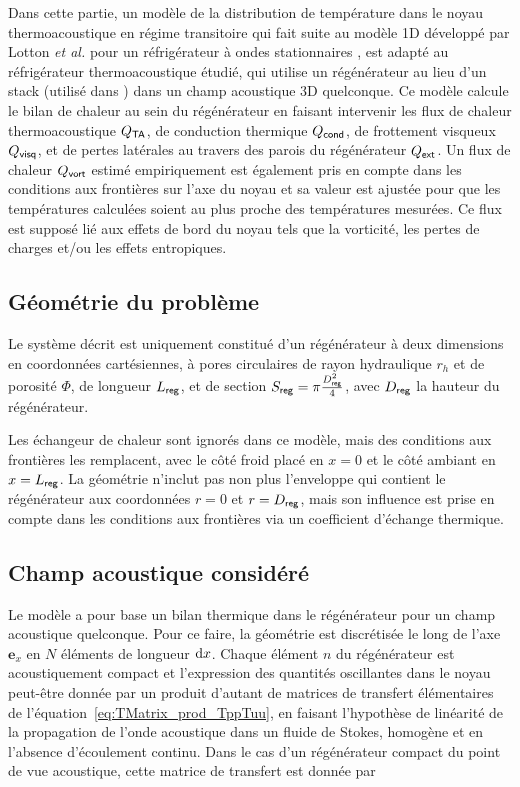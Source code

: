 Dans cette partie, un modèle de la distribution de température dans le noyau thermoacoustique en régime transitoire qui fait suite au modèle 1D développé par Lotton \textit{et al.} pour un réfrigérateur à ondes stationnaires \cite{lotton_transient_2009}, est adapté au réfrigérateur thermoacoustique étudié, qui utilise un régénérateur au lieu d'un stack (utilisé dans \cite{lotton_transient_2009}) dans un champ acoustique 3D quelconque. Ce modèle calcule le bilan de chaleur au sein du régénérateur en faisant intervenir les flux de chaleur thermoacoustique $Q_{\sf TA}$, de conduction thermique $Q_{\sf cond}$, de frottement visqueux $Q_{\sf visq}$, et de pertes latérales au travers des parois du régénérateur $Q_{\sf ext}$. Un flux de chaleur $Q_{\sf vort}$ estimé empiriquement est également pris en compte dans les conditions aux frontières sur l'axe du noyau et sa valeur est ajustée pour que les températures calculées soient au plus proche des températures mesurées. Ce flux est supposé lié aux effets de bord du noyau tels que la vorticité, les pertes de charges et/ou les effets entropiques. 

\subsection{Géométrie du problème}
Le système décrit est uniquement constitué d'un régénérateur à deux dimensions en coordonnées cartésiennes, à pores circulaires de rayon hydraulique $r_h$ et de porosité $\Phi$, de longueur $L_{\sf reg}$, et de section $S_{\sf reg} = \pi\frac{D^2_{\sf reg}}{4}$, avec $D_{\sf reg}$ la hauteur du régénérateur.\smallskip

Les échangeur de chaleur sont ignorés dans ce modèle, mais des conditions aux frontières les remplacent, avec le côté froid placé en $x=0$ et le côté ambiant en $x=L_{\sf reg}$. La géométrie n'inclut pas non plus l'enveloppe qui contient le régénérateur aux coordonnées $r=0$ et $r=D_{\sf reg}$, mais son influence est prise en compte dans les conditions aux frontières via un coefficient d'échange thermique.

\subsection{Champ acoustique considéré}
Le modèle a pour base un bilan thermique dans le régénérateur pour un champ acoustique quelconque. Pour ce faire, la géométrie est discrétisée le long de l'axe $\mathbf e_x$ en $N$ éléments de longueur $\mathrm{d} x$. Chaque élément $n$ du régénérateur est acoustiquement compact et l'expression des quantités oscillantes dans le noyau peut-être donnée par un produit d'autant de matrices de transfert élémentaires de l'équation~\eqref{eq:TMatrix_prod_TppTuu}, en faisant l'hypothèse de linéarité de la propagation de l'onde acoustique dans un fluide de Stokes, homogène et en l'absence d'écoulement continu. Dans le cas d'un régénérateur compact du point de vue acoustique, cette matrice de transfert est donnée par

